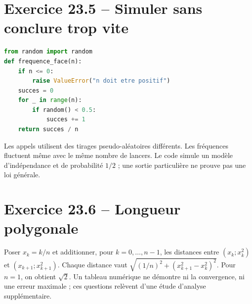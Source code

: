 \begin{finchapitre}
\section*{Exercice 23.5 -- Simuler sans conclure trop vite}
\begin{lstlisting}[language=Python]
from random import random
def frequence_face(n):
    if n <= 0:
        raise ValueError("n doit etre positif")
    succes = 0
    for _ in range(n):
        if random() < 0.5:
            succes += 1
    return succes / n
\end{lstlisting}
Les appels utilisent des tirages pseudo-aléatoires différents. Les fréquences fluctuent même avec le même nombre de lancers. Le code simule un modèle d'indépendance et de probabilité $1/2$ ; une sortie particulière ne prouve pas une loi générale.

\section*{Exercice 23.6 -- Longueur polygonale}
Poser $x_k=k/n$ et additionner, pour $k=0,\ldots,n-1$, les distances entre $(x_k;x_k^2)$ et $(x_{k+1};x_{k+1}^2)$. Chaque distance vaut $\sqrt{(1/n)^2+(x_{k+1}^2-x_k^2)^2}$. Pour $n=1$, on obtient $\sqrt2$. Un tableau numérique ne démontre ni la convergence, ni une erreur maximale ; ces questions relèvent d'une étude d'analyse supplémentaire.
\end{finchapitre}
